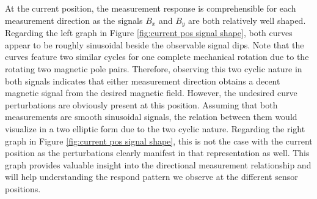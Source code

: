 \documentclass[english]{isasthesis}
\begin{document}
    		\\\\At the current position, the measurement response is comprehensible for each measurement direction as the signals $B_x$ and $B_y$ are both relatively well shaped. Regarding the left graph in Figure \ref{fig:current pos signal shape}, both curves appear to be roughly sinusoidal beside the observable signal dips. Note that the curves feature two similar cycles for one complete mechanical rotation due to the rotating two magnetic pole pairs. Therefore, observing this two cyclic nature in both signals indicates that either measurement direction obtains a decent magnetic signal from the desired magnetic field. However, the undesired curve perturbations are obviously present at this position. Assuming that both measurements are smooth sinusoidal signals, the relation between them would visualize in a two elliptic form due to the two cyclic nature. Regarding the right graph in Figure \ref{fig:current pos signal shape}, this is not the case with the current position as the perturbations clearly manifest in that representation as well. This graph provides valuable insight into the directional measurement relationship and will help understanding the respond pattern we observe at the different sensor positions. 
\end{document}
